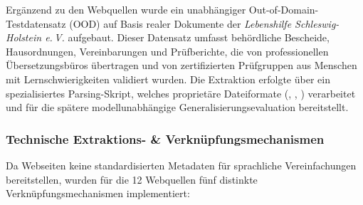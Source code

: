 Ergänzend zu den Webquellen wurde ein unabhängiger Out-of-Domain-Testdatensatz (OOD) auf Basis realer Dokumente der \textit{Lebenshilfe Schleswig-Holstein e.\,V.} aufgebaut. Dieser Datensatz umfasst behördliche Bescheide, Hausordnungen, Vereinbarungen und Prüfberichte, die von professionellen Übersetzungsbüros übertragen und von zertifizierten Prüfgruppen aus Menschen mit Lernschwierigkeiten validiert wurden. Die Extraktion erfolgte über ein spezialisiertes Parsing-Skript, welches proprietäre Dateiformate (, , ) verarbeitet und für die spätere modellunabhängige Generalisierungsevaluation bereitstellt.

\subsubsection{Technische Extraktions- \& Verknüpfungsmechanismen}
Da Webseiten keine standardisierten Metadaten für sprachliche Vereinfachungen bereitstellen, wurden für die 12 Webquellen fünf distinkte Verknüpfungsmechanismen implementiert:

